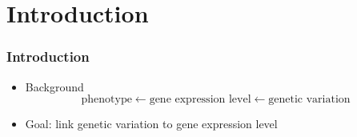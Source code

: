 \section{Introduction}
\begin{frame}
\sectionpage
\end{frame}

\begin{frame}
    \frametitle{Introduction}
    \begin{itemize}
      \item Background 
      \begin{equation*}
        \text{phenotype} \leftarrow 
        \text{gene expression level} \leftarrow 
        \text{genetic variation } 
      \end{equation*}


%      
\item Goal: link genetic variation to gene expression level

    \end{itemize}
\end{frame}

